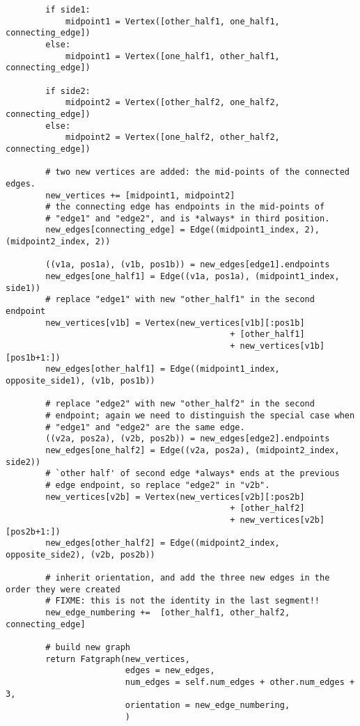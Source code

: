 \begin{lstlisting}
        if side1:
            midpoint1 = Vertex([other_half1, one_half1, connecting_edge])
        else:
            midpoint1 = Vertex([one_half1, other_half1, connecting_edge])

        if side2:
            midpoint2 = Vertex([other_half2, one_half2, connecting_edge])
        else:
            midpoint2 = Vertex([one_half2, other_half2, connecting_edge])

        # two new vertices are added: the mid-points of the connected edges.
        new_vertices += [midpoint1, midpoint2]
        # the connecting edge has endpoints in the mid-points of
        # "edge1" and "edge2", and is *always* in third position.
        new_edges[connecting_edge] = Edge((midpoint1_index, 2), (midpoint2_index, 2))

        ((v1a, pos1a), (v1b, pos1b)) = new_edges[edge1].endpoints
        new_edges[one_half1] = Edge((v1a, pos1a), (midpoint1_index, side1))
        # replace "edge1" with new "other_half1" in the second endpoint
        new_vertices[v1b] = Vertex(new_vertices[v1b][:pos1b]
                                             + [other_half1]
                                             + new_vertices[v1b][pos1b+1:])
        new_edges[other_half1] = Edge((midpoint1_index, opposite_side1), (v1b, pos1b))

        # replace "edge2" with new "other_half2" in the second
        # endpoint; again we need to distinguish the special case when
        # "edge1" and "edge2" are the same edge.
        ((v2a, pos2a), (v2b, pos2b)) = new_edges[edge2].endpoints
        new_edges[one_half2] = Edge((v2a, pos2a), (midpoint2_index, side2))
        # `other half' of second edge *always* ends at the previous
        # edge endpoint, so replace "edge2" in "v2b".
        new_vertices[v2b] = Vertex(new_vertices[v2b][:pos2b]
                                             + [other_half2]
                                             + new_vertices[v2b][pos2b+1:])
        new_edges[other_half2] = Edge((midpoint2_index, opposite_side2), (v2b, pos2b))

        # inherit orientation, and add the three new edges in the order they were created
        # FIXME: this is not the identity in the last segment!!
        new_edge_numbering +=  [other_half1, other_half2, connecting_edge]

        # build new graph 
        return Fatgraph(new_vertices,
                        edges = new_edges,
                        num_edges = self.num_edges + other.num_edges + 3,
                        orientation = new_edge_numbering,
                        )


\end{lstlisting}
